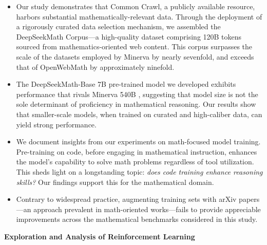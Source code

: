 \begin{itemize}[topsep=0pt]
    \item Our study demonstrates that Common Crawl, a publicly available resource, harbors substantial mathematically-relevant data. Through the deployment of a rigorously curated data selection mechanism, we assembled the DeepSeekMath Corpus—a high-quality dataset comprising 120B tokens sourced from mathematics-oriented web content. This corpus surpasses the scale of the datasets employed by Minerva \citep{minerva} by nearly sevenfold, and exceeds that of OpenWebMath \citep{openwebmath} by approximately ninefold.

    \item The DeepSeekMath-Base 7B pre-trained model we developed exhibits performance that rivals Minerva 540B \citep{minerva}, suggesting that model size is not the sole determinant of proficiency in mathematical reasoning. Our results show that smaller-scale models, when trained on curated and high-caliber data, can yield strong performance.

    \item We document insights from our experiments on math-focused model training. Pre-training on code, before engaging in mathematical instruction, enhances the model’s capability to solve math problems regardless of tool utilization. This sheds light on a longstanding topic: \textit{does code training enhance reasoning skills?} Our findings support this for the mathematical domain.

    \item Contrary to widespread practice, augmenting training sets with arXiv papers—an approach prevalent in math-oriented works—fails to provide appreciable improvements across the mathematical benchmarks considered in this study.
\end{itemize}

\textbf{Exploration and Analysis of Reinforcement Learning}

